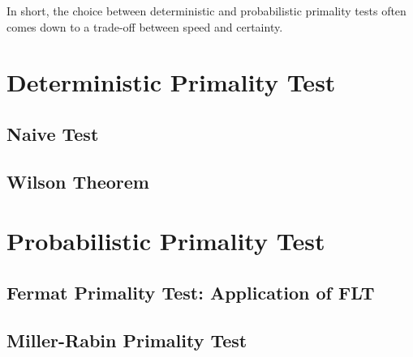 \documentclass[12pt,openany]{book}
\theoremstyle{definition}
\begin{document}
	In short, the choice between deterministic and probabilistic primality tests often comes down to a trade-off between speed and certainty.
	
	\newpage
	\section{Deterministic Primality Test}
	\subsection{Naive Test}
	\subsection{Wilson Theorem}
	
	\newpage
	\section{Probabilistic Primality Test}
	\subsection{Fermat Primality Test: Application of FLT}
	\subsection{Miller-Rabin Primality Test}
	
	
	\begin{tcolorbox}[colback=white,colframe=lemcolor,arc=5pt,title={\color{white}\bf }]
		
	\end{tcolorbox}
	
	\begin{tcolorbox}[colback=white,colframe=lemcolor,arc=5pt,title={\color{white}\bf }]
		
	\end{tcolorbox}
	
	\begin{tcolorbox}[colback=white,colframe=lemcolor,arc=5pt,title={\color{white}\bf }]
		
	\end{tcolorbox}
	
	\begin{tcolorbox}[colback=white,colframe=lemcolor,arc=5pt,title={\color{white}\bf }]
		
	\end{tcolorbox}
	
	\begin{tcolorbox}[colback=white,colframe=lemcolor,arc=5pt,title={\color{white}\bf }]
		
	\end{tcolorbox}
	
\end{document}
